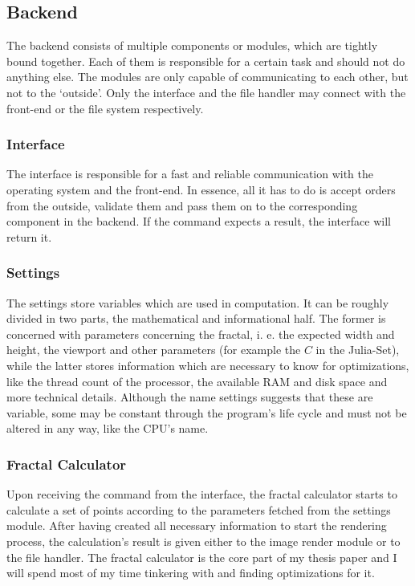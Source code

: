 \documentclass[10pt,a4paper,titlepage]{article}
\begin{document}
	\subsection{Backend}
	The backend consists of multiple components or modules, which are tightly bound together. Each of them is responsible for a certain task and should not do anything else. The modules are only capable of communicating to each other, but not to the `outside'. Only the interface and the file handler may connect with the front-end or the file system respectively.
	\subsubsection{Interface}
	The interface is responsible for a fast and reliable communication with the operating system and the front-end. In essence, all it has to do is accept orders from the outside, validate them and pass them on to the corresponding component in the backend. If the command expects a result, the interface will return it.
	\subsubsection{Settings}
	The settings store variables which are used in computation. It can be roughly divided in two parts, the mathematical and informational half. The former is concerned with parameters concerning the fractal, i. e. the expected width and height, the viewport and other parameters (for example the \(C\) in the Julia-Set), while the latter stores information which are necessary to know for optimizations, like the thread count of the processor, the available RAM and disk space and more technical details. Although the name settings suggests that these are variable, some may be constant through the program's life cycle and must not be altered in any way, like the CPU's name.
	\subsubsection{Fractal Calculator}
	Upon receiving the command from the interface, the fractal calculator starts to calculate a set of points according to the parameters fetched from the settings module. After having created all necessary information to start the rendering process, the calculation's result is given either to the image render module or to the file handler. The fractal calculator is the core part of my thesis paper and I will spend most of my time tinkering with and finding optimizations for it.
\end{document}

